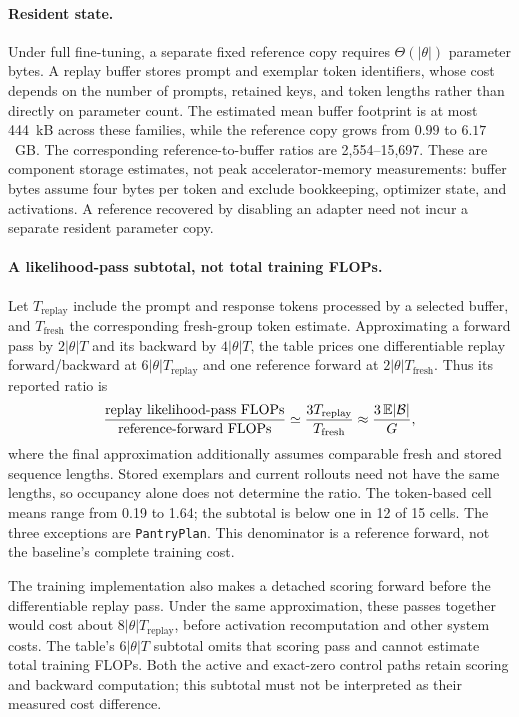 \paragraph{Resident state.}
Under full fine-tuning, a separate fixed reference copy requires
$\Theta(|\theta|)$ parameter bytes. A replay buffer stores prompt and exemplar
token identifiers, whose cost depends on the number of prompts, retained
keys, and token lengths rather than directly on parameter count. The
estimated mean buffer footprint is at most 444~kB across these
families, while the reference copy grows from $0.99$ to $6.17$~GB. The
corresponding reference-to-buffer ratios are 2,554--15,697.
These are component storage estimates, not peak accelerator-memory
measurements: buffer bytes assume four bytes per token and exclude bookkeeping,
optimizer state, and activations. A reference recovered by disabling an
adapter need not incur a separate resident parameter copy.

\paragraph{A likelihood-pass subtotal, not total training FLOPs.}
Let $T_{\mathrm{replay}}$ include the prompt and response tokens processed
by a selected buffer, and $T_{\mathrm{fresh}}$ the corresponding fresh-group
token estimate. Approximating a forward pass by $2|\theta|T$ and its backward
by $4|\theta|T$, the table prices one differentiable replay forward/backward
at $6|\theta|T_{\mathrm{replay}}$ and one reference forward at
$2|\theta|T_{\mathrm{fresh}}$. Thus its reported ratio is
\begin{equation}
  \frac{\text{replay likelihood-pass FLOPs}}{\text{reference-forward FLOPs}}
  \simeq \frac{3T_{\mathrm{replay}}}{T_{\mathrm{fresh}}}
  \approx \frac{3\,\mathbb E|\mathcal B|}{G},
  \label{eq:replay-flop-ratio}
\end{equation}
where the final approximation additionally assumes comparable fresh and
stored sequence lengths. Stored exemplars and current rollouts need not have
the same lengths, so occupancy alone does not determine the ratio. The
token-based cell means range from 0.19 to 1.64;
the subtotal is below one in 12 of 15 cells.
The three exceptions are \texttt{PantryPlan}. This denominator is a reference
forward, not the baseline's complete training cost.

The training implementation also makes a detached scoring forward before
the differentiable replay pass. Under the same approximation, these passes
together would cost about $8|\theta|T_{\mathrm{replay}}$, before activation
recomputation and other system costs. The table's $6|\theta|T$ subtotal omits
that scoring pass and cannot estimate total training FLOPs. Both the
active and exact-zero control paths retain scoring and backward computation;
this subtotal must not be interpreted as their measured cost difference.

